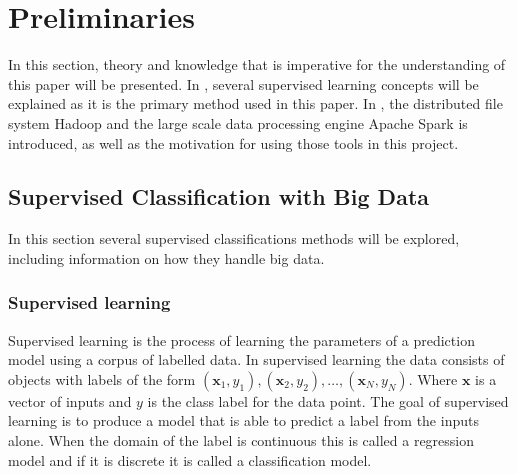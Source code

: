 \section{Preliminaries}\label{sec:prelim}
In this section, theory and knowledge that is imperative for the understanding of this paper will be presented. In , several supervised learning concepts will be explained as it is the primary method used in this paper. In , the distributed file system Hadoop and the large scale data processing engine Apache Spark is introduced, as well as the motivation for using those tools in this project.

\subsection{Supervised Classification with Big Data}\label{sec:supervisedclassification}
In this section several supervised classifications methods will be explored, including information on how they handle big data. 


\subsubsection{Supervised learning}
Supervised learning is the process of learning the parameters of a prediction model using a corpus of labelled data.
In supervised learning the data consists of objects with labels of the form 
$(\mathbf{x}_1,y_1),(\mathbf{x}_2,y_2), \dots, (\mathbf{x}_N,y_N)$.
Where $\textbf{x}$ is a vector of inputs and $y$ is the class label for the data point.
The goal of supervised learning is to produce a model that is able to predict a label from the inputs alone.
When the domain of the label is continuous this is called a regression model and if it is discrete it is called a classification model.


